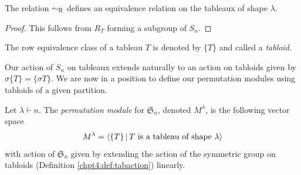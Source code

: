 \documentclass[11pt]{report}
\begin{document}
\begin{lemma}
	The relation $\sim_{\textnormal{R}}$ defines an 
	equivalence relation on the tableaux of shape $\lambda$. 
\end{lemma}
\begin{proof}
	This follows from $R_{T}$ forming a subgroup of $S_{n}$.
\end{proof}

\begin{defn}
	The row equivalence class of a tableau $T$ is denoted by $\{T\}$ and called a \emph{tabloid}.
\end{defn}


Our action of $S_{n}$ on tableaux extends naturally to an action 
on 
tabloids given by $\sigma \{T\} = \{\sigma T\}$. We are now in a position 
to define our permutation modules using tabloids 
of a given partition. 

\begin{defn}
	\label{chpt4:def:permmod}
	Let $\lambda \vdash n$. The \emph{permutation module} for $\mathfrak{S}_{n}$, denoted $M^{\lambda}$, is the following vector space
	\[M^{\lambda} = \langle \{T\} \, | \, T \textnormal{ is a tableau of shape } 
	\lambda \rangle\]
	with action of $\mathfrak{S}_{n}$ given by extending the action of the symmetric group on tabloids (Definition \ref{chpt4:def:tabaction}) linearly.
\end{defn}
\end{document}
